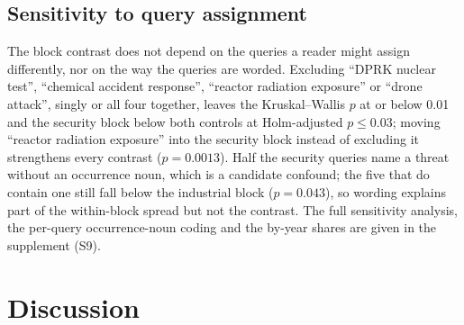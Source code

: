 \documentclass[1p,times]{elsarticle}
\begin{document}
\subsection{Sensitivity to query assignment}
\label{sec:sens}
The block contrast does not depend on the queries a reader might assign differently, nor on the way the queries are worded. Excluding ``DPRK nuclear test'', ``chemical accident response'', ``reactor radiation exposure'' or ``drone attack'', singly or all four together, leaves the Kruskal--Wallis $p$ at or below 0.01 and the security block below both controls at Holm-adjusted $p \le 0.03$; moving ``reactor radiation exposure'' into the security block instead of excluding it strengthens every contrast ($p = 0.0013$). Half the security queries name a threat without an occurrence noun, which is a candidate confound; the five that do contain one still fall below the industrial block ($p = 0.043$), so wording explains part of the within-block spread but not the contrast. The full sensitivity analysis, the per-query occurrence-noun coding and the by-year shares are given in the supplement (S9).

\section{Discussion}
\label{sec:discussion}
\end{document}
